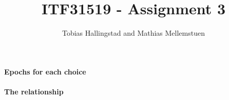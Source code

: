 \documentclass[10pt]{article}
\title{ITF31519 - Assignment 3}
\author{Tobias Hallingstad and Mathias Mellemstuen}
\begin{document}
    \begin{titlepage}
        \maketitle
    \end{titlepage}


    \paragraph{Epochs for each choice}

    \paragraph{The relationship}
\end{document}
